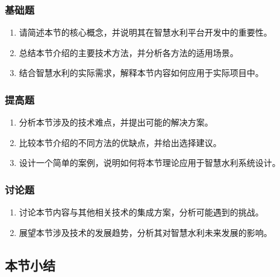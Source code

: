 \hypertarget{ux57faux7840ux9898-4}{%
\subsubsection{基础题}\label{ux57faux7840ux9898-4}}

\begin{enumerate}
\def\labelenumi{\arabic{enumi}.}
\tightlist
\item
  请简述本节的核心概念，并说明其在智慧水利平台开发中的重要性。
\item
  总结本节介绍的主要技术方法，并分析各方法的适用场景。
\item
  结合智慧水利的实际需求，解释本节内容如何应用于实际项目中。
\end{enumerate}

\hypertarget{ux63d0ux9ad8ux9898-4}{%
\subsubsection{提高题}\label{ux63d0ux9ad8ux9898-4}}

\begin{enumerate}
\def\labelenumi{\arabic{enumi}.}
\tightlist
\item
  分析本节涉及的技术难点，并提出可能的解决方案。
\item
  比较本节介绍的不同方法的优缺点，并给出选择建议。
\item
  设计一个简单的案例，说明如何将本节理论应用于智慧水利系统设计。
\end{enumerate}

\hypertarget{ux8ba8ux8bbaux9898-4}{%
\subsubsection{讨论题}\label{ux8ba8ux8bbaux9898-4}}

\begin{enumerate}
\def\labelenumi{\arabic{enumi}.}
\tightlist
\item
  讨论本节内容与其他相关技术的集成方案，分析可能遇到的挑战。
\item
  展望本节涉及技术的发展趋势，分析其对智慧水利未来发展的影响。
\end{enumerate}

\hypertarget{ux672cux8282ux5c0fux7ed3-3}{%
\subsection{本节小结}\label{ux672cux8282ux5c0fux7ed3-3}}

